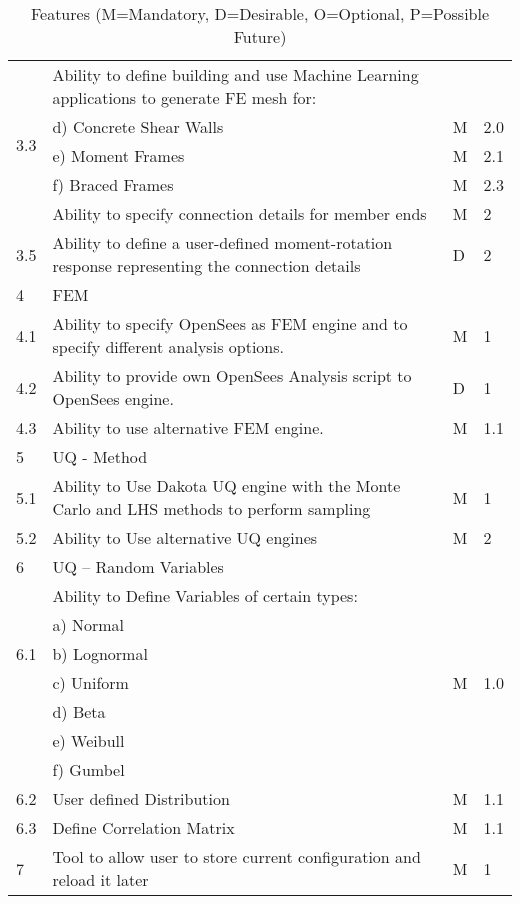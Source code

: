\begin{table}[hbt!]
\begin{adjustbox}{max width=\textwidth}
\begin{tabular}{llll}
	\multirow{5}{*}{3.3} & Ability to define building and use Machine Learning applications to generate FE mesh for: &  &  \\ 
	 & d)     Concrete Shear Walls & M & 2.0 \\ 
	 & e)     Moment Frames & M & 2.1 \\ 
	 & f)      Braced Frames & M & 2.3  \\ \hline

	3.4 & Ability to specify connection details for member ends & M & 2 \\ \hline
	3.5 & Ability to define a user-defined moment-rotation response representing the connection details & D & 2 \\ \hline
	4 & FEM &  &  \\ \hline
	4.1 & Ability to specify OpenSees as FEM engine and to specify different analysis options. & M & 1 \\ \hline
	4.2 & Ability to provide own OpenSees Analysis script to OpenSees engine. & D & 1 \\ \hline
	4.3 & Ability to use alternative FEM engine. & M & 1.1 \\ \hline
	5 & UQ - Method &  &  \\ \hline
	5.1 & Ability to Use Dakota UQ engine with the Monte Carlo and LHS methods to perform sampling & M & 1 \\ \hline
	5.2 & Ability to Use alternative UQ engines & M & 2 \\ \hline
	6 & UQ – Random Variables &  &  \\ \hline
	\multirow{5}{*}{6.1} & Ability to Define Variables of certain types: &  &  \\ 
	 & a)     Normal &  &  \\ 
	 & b)     Lognormal &  &  \\ 
	 & c)     Uniform & M  & 1.0 \\ 
	 & d)     Beta &  &  \\ 
	 & e)     Weibull &  &  \\ 
	 & f)      Gumbel &  &  \\ \hline
	6.2 & User defined Distribution & M & 1.1 \\ \hline
	6.3 & Define Correlation Matrix & M & 1.1 \\ \hline
	7 & Tool to allow user to store current configuration and reload it later & M & 1 \\ 
      \bottomrule                                  
  \end{tabular}
\end{adjustbox}
  \caption{Features (M=Mandatory, D=Desirable, O=Optional, P=Possible Future)}             
  \label{tab:features}                 
\end{table}

